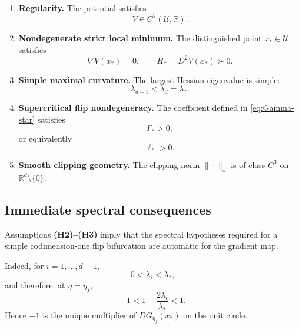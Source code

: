 \begin{enumerate}[
label=\textbf{(H\arabic*)},
leftmargin=2.8em,
itemsep=0.8em
]

\item
\label{H1}
\textbf{Regularity.}
The potential satisfies
\[
V\in C^7(\mathcal U,\mathbb{R}).
\]

\item
\label{H2}
\textbf{Nondegenerate strict local minimum.}
The distinguished point $x_*\in\mathcal U$ satisfies
\begin{equation}
\nabla V(x_*)=0,
\qquad
H_*=D^2V(x_*)\succ0.
\label{eq:H2}
\end{equation}

\item
\label{H3}
\textbf{Simple maximal curvature.}
The largest Hessian eigenvalue is simple:
\begin{equation}
\lambda_{d-1}<\lambda_d=\lambda_*.
\label{eq:H3}
\end{equation}

\item
\label{H4}
\textbf{Supercritical flip nondegeneracy.}
The coefficient defined in \eqref{eq:Gamma-star} satisfies
\begin{equation}
\Gamma_*>0,
\label{eq:H4}
\end{equation}
or equivalently
\[
\ell_*>0.
\]

\item
\label{H5}
\textbf{Smooth clipping geometry.}
The clipping norm $\|\cdot\|_\diamond$ is of class $C^3$ on
$\mathbb{R}^d\setminus\{0\}$.
\end{enumerate}

\subsection{Immediate spectral consequences}
\label{subsec:spectral-consequences}

Assumptions \textbf{(H2)--(H3)} imply that the spectral hypotheses
required for a simple codimension-one flip bifurcation are automatic
for the gradient map.

Indeed, for $i=1,\ldots,d-1$,
\[
0<\lambda_i<\lambda_*,
\]
and therefore, at $\eta=\eta_f$,
\begin{equation}
-1
<
1-\frac{2\lambda_i}{\lambda_*}
<
1.
\label{eq:noncritical-spectrum}
\end{equation}
Hence $-1$ is the unique multiplier of $DG_{\eta_f}(x_*)$ on the
unit circle.

